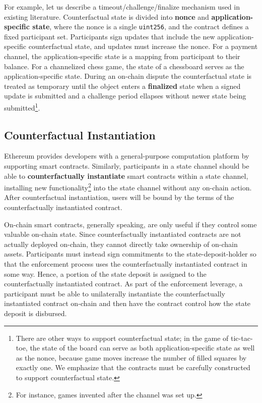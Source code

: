 \documentclass[prb,floatfix,reprint,nofootinbib,amsmath,amssymb,epsfig,pre,floats,letterpaper,groupedaffiliation,tightenlines,allcolors=blue,11pt]{revtex4}
\theoremstyle{definition}
\theoremstyle{definition}
\theoremstyle{definition}
\begin{document}
For example, let us describe a timeout/challenge/finalize mechanism used in existing literature. Counterfactual state is divided into \textbf{nonce} and \textbf{application-specific state}, where the nonce is a single \texttt{uint256}, and the contract defines a fixed participant set. Participants sign updates that include the new application-specific counterfactual state, and updates must increase the nonce. For a payment channel, the application-specific state is a mapping from participant to their balance. For a channelized chess game, the state of a chessboard serves as the application-specific state. During an on-chain dispute the counterfactual state is treated as temporary until the object enters a \textbf{finalized} state when a signed update is submitted and a challenge period ellapses without newer state being submitted\footnote{There are other ways to support counterfactual state; in the game of tic-tac-toe, the state of the board can serve as both application-specific state as well as the nonce, because game moves increase the number of filled squares by exactly one. We emphasize that the contracts must be carefully constructed to support counterfactual state.}.

\subsection{Counterfactual Instantiation}

Ethereum provides developers with a general-purpose computation platform by supporting smart contracts. Similarly, participants in a state channel should be able to \textbf{counterfactually instantiate} smart contracts within a state channel, installing new functionality\footnote{For instance, games invented after the channel was set up.} into the state channel without any on-chain action. After counterfactual instantiation, users will be bound by the terms of the counterfactually instantiated contract.

On-chain smart contracts, generally speaking, are only useful if they control some valuable on-chain state. Since counterfactually instantiated contracts are not actually deployed on-chain, they cannot directly take ownership of on-chain assets. Participants must instead sign commitments to the state-deposit-holder so that the enforcement process uses the counterfactually instantiated contract in some way. Hence, a portion of the state deposit is assigned to the counterfactually instantiated contract. As part of the enforcement leverage, a participant must be able to unilaterally instantiate the counterfactually instantiated contract on-chain and then have the contract control how the state deposit is disbursed.
\end{document}
